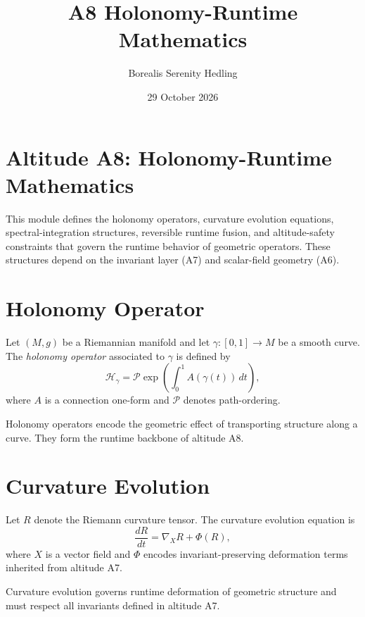 \documentclass[12pt]{article}
\title{A8 Holonomy-Runtime Mathematics}
\author{Borealis Serenity Hedling}
\date{29 October 2026}
\begin{document}
\maketitle

\section*{Altitude A8: Holonomy-Runtime Mathematics}

This module defines the holonomy operators, curvature evolution equations,
spectral-integration structures, reversible runtime fusion, and altitude-safety
constraints that govern the runtime behavior of geometric operators. These
structures depend on the invariant layer (A7) and scalar-field geometry (A6).

\section{Holonomy Operator}

\begin{definition}
Let $(M, g)$ be a Riemannian manifold and let $\gamma : [0,1] \to M$ be a smooth
curve. The \emph{holonomy operator} associated to $\gamma$ is defined by
\[
\mathcal{H}_\gamma = \mathcal{P} \exp \left( \int_0^1 A(\gamma(t)) \, dt \right),
\]
where $A$ is a connection one-form and $\mathcal{P}$ denotes path-ordering.
\end{definition}

\begin{remark}
Holonomy operators encode the geometric effect of transporting structure along
a curve. They form the runtime backbone of altitude A8.
\end{remark}

\section{Curvature Evolution}

\begin{definition}
Let $R$ denote the Riemann curvature tensor. The curvature evolution equation is
\[
\frac{dR}{dt} = \nabla_X R + \Phi(R),
\]
where $X$ is a vector field and $\Phi$ encodes invariant-preserving deformation
terms inherited from altitude A7.
\end{definition}

\begin{remark}
Curvature evolution governs runtime deformation of geometric structure and must
respect all invariants defined in altitude A7.
\end{remark}
\end{document}
